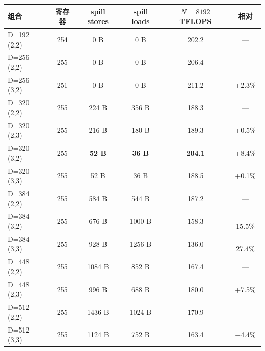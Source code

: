 \begin{center}
\footnotesize
\begin{tabular}{lccccc}
\toprule
组合 & 寄存器 & spill stores & spill loads & $N{=}8192$ TFLOPS & 相对 \\
\midrule
D=192 (2,2) & 254 & 0 B & 0 B & 202.2 & --- \\
D=256 (2,2) & 255 & 0 B & 0 B & 206.4 & --- \\
D=256 (3,2) & 251 & 0 B & 0 B & 211.2 & +2.3\% \\
D=320 (2,2) & 255 & 224 B & 356 B & 188.3 & --- \\
D=320 (2,3) & 255 & 216 B & 180 B & 189.3 & +0.5\% \\
D=320 (3,2) & 255 & \textbf{52 B} & \textbf{36 B} & \textbf{204.1} & +8.4\% \\
D=320 (3,3) & 255 & 52 B & 36 B & 188.5 & +0.1\% \\
D=384 (2,2) & 255 & 584 B & 544 B & 187.2 & --- \\
D=384 (3,2) & 255 & 676 B & 1000 B & 158.3 & $-$15.5\% \\
D=384 (3,3) & 255 & 928 B & 1256 B & 136.0 & $-$27.4\% \\
D=448 (2,2) & 255 & 1084 B & 852 B & 167.4 & --- \\
D=448 (2,3) & 255 & 996 B & 688 B & 180.0 & +7.5\% \\
D=512 (2,2) & 255 & 1436 B & 1024 B & 170.9 & --- \\
D=512 (3,3) & 255 & 1124 B & 752 B & 163.4 & $-$4.4\% \\
\bottomrule
\end{tabular}
\end{center}

